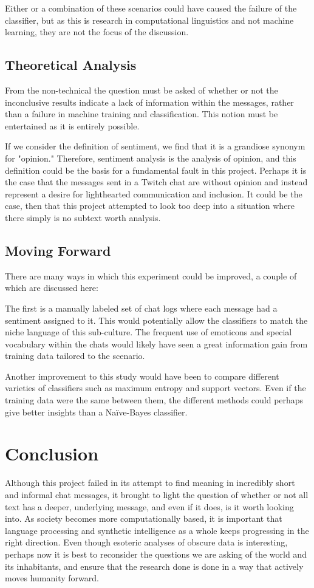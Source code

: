 \documentclass[12pt]{article}
\begin{document}
Either or a combination of these scenarios could have caused the failure of the classifier, but as this is research in computational linguistics and not machine learning, they are not the focus of the discussion.

\subsection{Theoretical Analysis}
From the non-technical the question must be asked of whether or not the inconclusive results indicate a lack of information within the messages, rather than a failure in machine training and classification. This notion must be entertained as it is entirely possible.  

If we consider the definition of sentiment, we find that it is a grandiose synonym for "opinion." Therefore, sentiment analysis is the analysis of opinion, and this definition could be the basis for a fundamental fault in this project. Perhaps it is the case that the messages sent in a Twitch chat are without opinion and instead represent a desire for lighthearted communication and inclusion. It could be the case, then that this project attempted to look too deep into a situation where there simply is no subtext worth analysis.

\subsection{Moving Forward}
There are many ways in which this experiment could be improved, a couple of which are discussed here:

The first is a manually labeled set of chat logs where each message had a sentiment assigned to it. This would potentially allow the classifiers to match the niche language of this sub-culture. The frequent use of emoticons and special vocabulary within the chats would likely have seen a great information gain from training data tailored to the scenario.

Another improvement to this study would have been to compare different varieties of classifiers such as maximum entropy and support vectors. Even if the training data were the same between them, the different methods could perhaps give better insights than a Naïve-Bayes classifier.
\pagebreak
\section{Conclusion}
Although this project failed in its attempt to find meaning in incredibly short and informal chat messages, it brought to light the question of whether or not all text has a deeper, underlying message, and even if it does, is it worth looking into. As society becomes more computationally based, it is important that language processing and synthetic intelligence as a whole keeps progressing in the right direction. Even though esoteric analyses of obscure data is interesting, perhaps now it is best to reconsider the questions we are asking of the world and its inhabitants, and ensure that the research done is done in a way that actively moves humanity forward.

\newpage


{}
\end{document}
